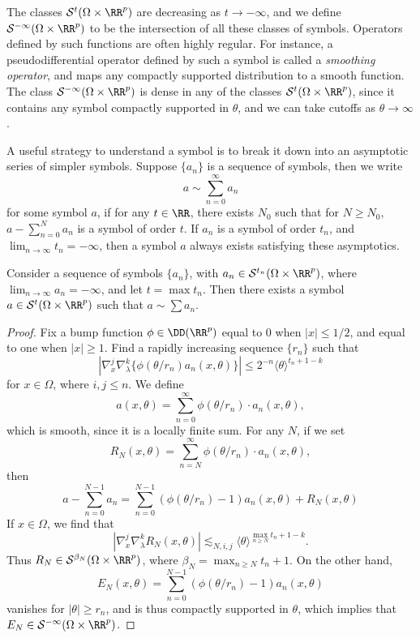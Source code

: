 The classes $\mathcal{S}^t(\Omega \times \RR^p)$ are decreasing as $t \to -\infty$, and we define $\mathcal{S}^{-\infty}(\Omega \times \RR^p)$ to be the intersection of all these classes of symbols. Operators defined by such functions are often highly regular. For instance, a pseudodifferential operator defined by such a symbol is called a \emph{smoothing operator}, and maps any compactly supported distribution to a smooth function. The class $\mathcal{S}^{-\infty}(\Omega \times \RR^p)$ is dense in any of the classes $\mathcal{S}^t(\Omega \times \RR^p)$, since it contains any symbol compactly supported in $\theta$, and we can take cutoffs as $\theta \to \infty$.

A useful strategy to understand a symbol is to break it down into an asymptotic series of simpler symbols. Suppose $\{ a_n \}$ is a sequence of symbols, then we write
%
\[ a \sim \sum_{n = 0}^\infty a_n \]
%
for some symbol $a$, if for any $t \in \RR$, there exists $N_0$ such that for $N \geq N_0$, $a - \sum_{n = 0}^N a_n$ is a symbol of order $t$. If $a_n$ is a symbol of order $t_n$, and $\lim_{n \to \infty} t_n = -\infty$, then a symbol $a$ always exists satisfying these asymptotics.

\begin{theorem}
    Consider a sequence of symbols $\{ a_n \}$, with $a_n \in \mathcal{S}^{t_n}(\Omega \times \RR^p)$, where $\lim_{n \to \infty} a_n = -\infty$, and let $t = \max t_n$. Then there exists a symbol $a \in \mathcal{S}^t(\Omega \times \RR^p)$ such that $a \sim \sum a_n$.
\end{theorem}
\begin{proof}
    Fix a bump function $\phi \in \DD(\RR^p)$ equal to 0 when $|x| \leq 1/2$, and equal to one when $|x| \geq 1$. Find a rapidly increasing sequence $\{ r_n \}$ such that
    \[ | \nabla_x^j \nabla_\lambda^k \{ \phi( \theta / r_n ) a_n(x,\theta) \} | \leq 2^{-n} \langle \theta \rangle^{t_n + 1 - k} \]
    for $x \in \Omega$, where $i,j \leq n$. We define
    \[ a(x,\theta) = \sum_{n = 0}^\infty \phi(\theta / r_n) \cdot a_n(x,\theta), \]
    which is smooth, since it is a locally finite sum. For any $N$, if we set
    \[ R_N(x,\theta) = \sum_{n = N}^\infty \phi(\theta / r_n) \cdot a_n(x,\theta), \]
    then
    \[ a - \sum_{n = 0}^{N-1} a_n = \sum_{n = 0}^{N-1} (\phi(\theta/r_n) - 1) a_n(x,\theta) + R_N(x,\theta) \]
    If $x \in \Omega$, we find that
    \[ | \nabla_x^j \nabla_\lambda^k R_N(x,\theta) | \lesssim_{N,i,j} \langle \theta \rangle^{\max_{n \geq N} t_n + 1 - k}. \]
    Thus $R_N \in \mathcal{S}^{\beta_N}(\Omega \times \RR^p)$, where $\beta_N = \max_{n \geq N} t_n + 1$. On the other hand,
    \[ E_N(x,\theta) = \sum_{n = 0}^{N-1} (\phi(\theta/r_n) - 1) a_n(x,\theta) \]
    vanishes for $|\theta| \geq r_n$, and is thus compactly supported in $\theta$, which implies that $E_N \in \mathcal{S}^{-\infty}(\Omega \times \RR^p)$.
\end{proof}

